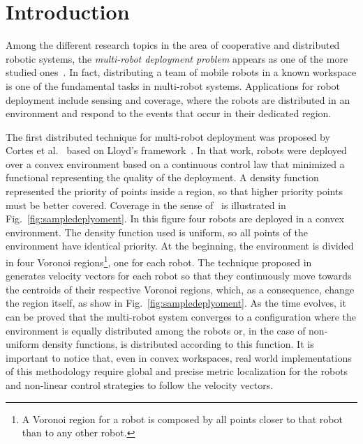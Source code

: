 \documentclass[twocolumn]{svjour3}       %
\begin{document}
\section{Introduction}

Among the different research topics in the area of cooperative and distributed robotic systems, the \textit{multi-robot deployment problem} appears as one of the more studied ones~\cite{DistCtrlRobotNetw}. In fact, distributing a team of mobile robots in a known workspace is one of the fundamental tasks in multi-robot systems. Applications for robot deployment include sensing and coverage, where the robots are distributed in an environment and respond to the events that occur in their dedicated region. 

The first distributed technique for multi-robot deployment was proposed  by Cortes et al.~\cite{Cortes2004} based on Lloyd's framework~\cite{Lloyd1982}. In that work, robots were deployed over a convex environment based on a continuous control law that minimized a functional representing the quality of the deployment. 
%
A density function represented the priority of points inside a region, so that higher priority points must be better covered. Coverage in the sense of~\cite{Cortes2004} is illustrated in Fig.~\ref{fig:sampledeplyoment}. In this figure four robots are deployed in a convex environment. The density function used is uniform, so all points of the environment have identical priority. At the beginning, the environment is divided in four Voronoi regions\footnote{A Voronoi region for a robot is composed by all points closer to that robot than to any other robot.}, one for each robot. The technique proposed in~\cite{Cortes2004} generates velocity vectors for each robot so that they continuously move towards the centroids of their respective Voronoi regions, which, as a consequence, change the region itself, as show in Fig.~\ref{fig:sampledeplyoment}. As the time evolves, it can be proved that the multi-robot system converges to a configuration where the environment is equally distributed among the robots or, in the case of non-uniform density functions, is distributed according to this function. It is important to notice that, even in convex workspaces, real world implementations of this methodology require global and precise metric localization for the robots and non-linear control strategies to follow the velocity vectors. 
\end{document}
